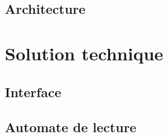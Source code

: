\documentclass[a4paper,11pt]{article}
\begin{document}
\subsection{Architecture}
%
%
% 
%
%



\section{Solution technique}
\subsection{Interface}
\subsection{Automate de lecture}
\end{document}
